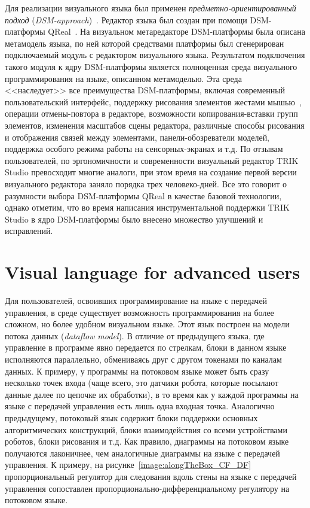 \documentclass[conference]{IEEEtran}
\begin{document}
Для реализации визуального языка был применен \textit{предметно-ориентированный подход} (\textit{DSM-approach})~\cite{koznov2008}. Редактор языка был создан при помощи DSM-платформы QReal~\cite{qrealMeta,kuzenkova2013qreal}. На визуальном метаредакторе DSM-платформы была описана метамодель языка, по ней которой средствами платформы был сгенерирован подключаемый модуль с редактором визуального языка. Результатом подключения такого модуля к ядру DSM-платформы является полноценная среда визуального программирования на языке, описанном метамоделью. Эта среда <<наследует>> все преимущества DSM-платформы, включая современный пользовательский интерфейс, поддержку рисования элементов жестами мышью~\cite{osechkina2010gestures,osechkina2012multistroke}, операции отмены-повтора в редакторе, возможности копирования-вставки групп элементов, изменения масштабов сцены редактора, различные способы рисования и отображения связей между элементами, панели-обозреватели моделей, поддержка особого режима работы на сенсорных-экранах и т.д. По отзывам пользователей, по эргономичности и современности визуальный редактор TRIK Studio превосходит многие аналоги, при этом время на создание первой версии визуального редактора заняло порядка трех человеко-дней. Все это говорит о разумности выбора DSM-платформы QReal в качестве базовой технологии, однако отметим, что во время написания инструментальной поддержки TRIK Studio в ядро DSM-платформы было внесено множество улучшений и исправлений.

\section{Visual language for advanced users}
\label{chapter:dataFlowLanguage}

Для пользователей, освоивших программирование на языке с передачей управления, в среде существует возможность программирования на более сложном, но более удобном визуальном языке. Этот язык построен на модели потока данных (\textit{dataflow model}). В отличие от предыдущего языка, где управление в программе явно передается по стрелкам, блоки в данном языке исполняются параллельно, обмениваясь друг с другом токенами по каналам данных. К примеру, у программы на потоковом языке может быть сразу несколько точек входа (чаще всего, это датчики робота, которые посылают данные далее по цепочке их обработки), в то время как у каждой программы на языке с передачей управления есть лишь одна входная точка. Аналогично предыдущему, потоковый язык содержит блоки поддержки основных алгоритмических конструкций, блоки взаимодействия со всеми устройствами роботов, блоки рисования и т.д. Как правило, диаграммы на потоковом языке получаются лаконичнее, чем аналогичные диаграммы на языке с передачей управления. К примеру, на рисунке~\ref{image:alongTheBox_CF_DF} пропорциональный регулятор для следования вдоль стены на языке с передачей управления сопоставлен пропорционально-дифференциальному регулятору на потоковом языке.
\end{document}
